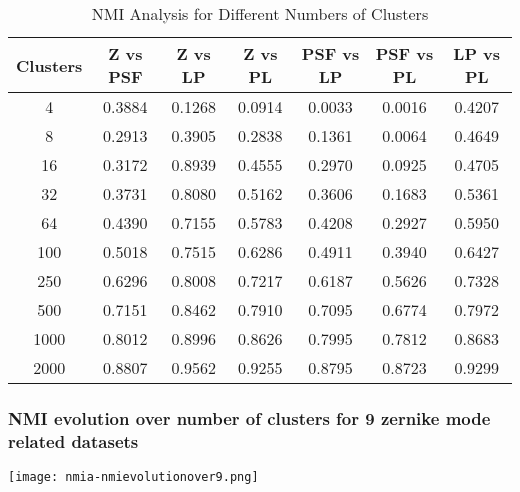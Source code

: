 		\begin{table}[h!]
\centering
\begin{tabular}{|c|c|c|c|c|c|c|}
\hline
\textbf{Clusters} & \textbf{Z vs PSF} & \textbf{Z vs LP} & \textbf{Z vs PL} & \textbf{PSF vs LP} & \textbf{PSF vs PL} & \textbf{LP vs PL} \\
\hline
4  & 0.3884 & 0.1268 & 0.0914 & 0.0033 & 0.0016 & 0.4207 \\
8  & 0.2913 & 0.3905 & 0.2838 & 0.1361 & 0.0064 & 0.4649 \\
16 & 0.3172 & 0.8939 & 0.4555 & 0.2970 & 0.0925 & 0.4705 \\
32 & 0.3731 & 0.8080 & 0.5162 & 0.3606 & 0.1683 & 0.5361 \\
64 & 0.4390 & 0.7155 & 0.5783 & 0.4208 & 0.2927 & 0.5950 \\
100 & 0.5018 & 0.7515 & 0.6286 & 0.4911 & 0.3940 & 0.6427 \\
250 & 0.6296 & 0.8008 & 0.7217 & 0.6187 & 0.5626 & 0.7328 \\
500 & 0.7151 & 0.8462 & 0.7910 & 0.7095 & 0.6774 & 0.7972 \\
1000 & 0.8012 & 0.8996 & 0.8626 & 0.7995 & 0.7812 & 0.8683 \\
2000 & 0.8807 & 0.9562 & 0.9255 & 0.8795 & 0.8723 & 0.9299 \\
\hline
\end{tabular}
\caption{NMI Analysis for Different Numbers of Clusters}
\end{table}
		\FloatBarrier
		
	\subsubsection{NMI evolution over number of clusters for 9 zernike mode related datasets}
		\begin{figure*}[ht!]
			\centering
			\texttt{[image: nmia-nmievolutionover9.png]}
		\end{figure*}

